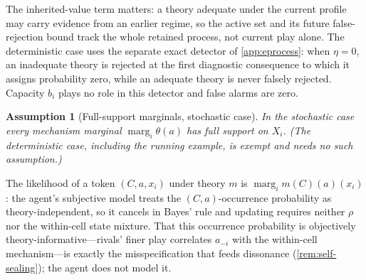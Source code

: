 \documentclass[11pt]{article}
\newtheorem{assumption}{Assumption}[section]
\theoremstyle{definition}
\newcommand{\marg}[1]{\operatorname{marg}_{#1}}
\begin{document}
The inherited-value term matters: a theory adequate under the current profile may carry evidence from an earlier regime, so the active set and its future false-rejection bound track the whole retained process, not current play alone.
The deterministic case uses the separate exact detector of \cref{app:eprocess}: when $\eta=0$, an inadequate theory is rejected at the first diagnostic consequence to which it assigns probability zero, while an adequate theory is never falsely rejected.
Capacity $b_i$ plays no role in this detector and false alarms are zero.

\begin{assumption}[Full-support marginals, stochastic case]
\label{ass:full-support}
In the stochastic case every mechanism marginal $\marg{i}\theta(a)$ has full support on $X_i$.
(The deterministic case, including the running example, is exempt and needs no such assumption.)
\end{assumption}

The likelihood of a token $(C,a,x_i)$ under theory $m$ is $\marg{i}m(C)(a)(x_i)$: the agent's subjective model treats the $(C,a)$-occurrence probability as theory-independent, so it cancels in Bayes' rule and updating requires neither $\rho$ nor the within-cell state mixture.
That this occurrence probability is objectively theory-informative---rivals' finer play correlates $a_{-i}$ with the within-cell mechanism---is exactly the misspecification that feeds dissonance (\cref{rem:self-sealing}); the agent does not model it.
\end{document}
